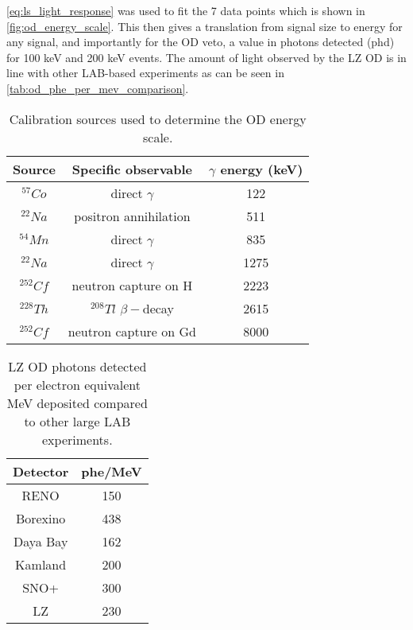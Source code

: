 \par
\autoref{eq:ls_light_response} was used to fit the 7 data points which is shown in \autoref{fig:od_energy_scale}.
This then gives a translation from signal size to energy for any signal, and importantly for the OD veto, a value in photons detected (phd) for 100 keV and 200 keV events.
The amount of light observed by the LZ OD is in line with other LAB-based experiments as can be seen in \autoref{tab:od_phe_per_mev_comparison}.
\begin{table}[]%
    \centering
    \begin{tabular}{c|c|c}
        Source      & Specific observable         &  $\gamma$ energy (keV) \\ \hline
        ${}^{57}Co$ & direct $\gamma$             & 122                        \\
        ${}^{22}Na$ & positron annihilation       & 511               \\
        ${}^{54}Mn$ & direct $\gamma$             & 835                        \\
        ${}^{22}Na$ & direct $\gamma$             & 1275               \\
        ${}^{252}Cf$ & neutron capture on H       & 2223            \\
        ${}^{228}Th$ & ${}^{208}Tl$ $\beta-$decay & 2615            \\
        ${}^{252}Cf$ & neutron capture on Gd      & 8000            
        
    \end{tabular}
    \caption{Calibration sources used to determine the OD energy scale.}
    \label{tab:od_energy_calibration_sources}
\end{table}



\begin{table}[]%
    \centering
    \begin{tabular}{c|c}
        Detector & phe/MeV \\ \hline
        RENO     & 150 \cite{reno_phe_per_mev_ref} \\
        Borexino & 438 \cite{pablo_mosteiro_thesis_ref} \\
        Daya Bay & 162 \cite{dayabay_phe_per_mev_ref} \\
        Kamland  & 200 \cite{kamland_phe_per_mev_ref} \\
        SNO+     & 300 \cite{snoplus_phe_per_mev_ref} \\
        LZ       & 230 
    \end{tabular}
    \caption{LZ OD photons detected per electron equivalent MeV deposited compared to other large LAB experiments.}
    \label{tab:od_phe_per_mev_comparison}
\end{table}


